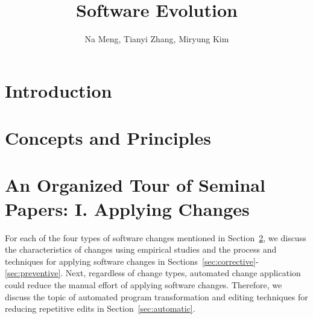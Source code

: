 \documentclass[runningheads,a4paper]{llncs}
\begin{document}
\mainmatter  %

\title{Software Evolution} 


%
%
\author{Na Meng, Tianyi Zhang, Miryung Kim} 



\maketitle


\begin{abstract}

\end{abstract}

\section{Introduction}


\section{Concepts and Principles}
\label{sec:concepts}
\label{sec:classification} 


\section{An Organized Tour of Seminal Papers: I. Applying Changes}
\label{sec:apply}

For each of the four types of software changes mentioned in Section~\ref{sec:concepts}, we discuss the characteristics of changes using empirical studies and the process and techniques for applying software changes in Sections~\ref{sec:corrective}-\ref{sec:preventive}. Next, regardless of change types, automated change application could reduce the manual effort of applying software changes. Therefore, we discuss the topic of automated program transformation and editing techniques for reducing repetitive edits in Section~\ref{sec:automatic}.
\end{document}
